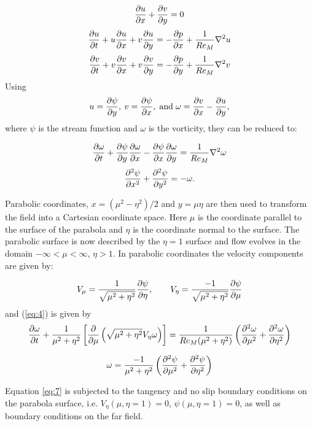 \[
\frac{\partial u}{\partial x} + \frac{\partial v}{\partial y} = 0
\]
\[
\frac{\partial u}{\partial t} + u \frac{\partial u}{\partial x} + v \frac{\partial u}{\partial y} = - \frac{\partial p}{\partial x} + \frac{1}{Re_M} \nabla^2 u
\]
\begin{equation}
\label{eq:1}
\frac{\partial v}{\partial t} + v \frac{\partial v}{\partial x} + v \frac{\partial v}{\partial y} = - \frac{\partial p}{\partial y} + \frac{1}{Re_M} \nabla^2 v
\end{equation}
%
Using
\begin{equation}
\label{eq:2}
u=\frac{\partial \psi}{\partial y},\: v=\frac{\partial \psi}{\partial x},\; \mathrm{and}\; \omega=\frac{\partial v}{\partial x} - \frac{\partial u}{\partial y},
\end{equation}
%
where $\psi$ is the stream function and $\omega$ is the vorticity, they can be reduced to:

\[
\frac{\partial \omega}{\partial t} + \frac{\partial \psi}{\partial y} \frac{\partial \omega}{\partial x} - \frac{\partial \psi}{\partial x} \frac{\partial \omega}{\partial y} = \frac{1}{Re_M} \nabla^2\omega
\]
\begin{equation}
\frac{\partial^2 \psi}{\partial x^2} + \frac{\partial^2 \psi}{\partial y^2} = -\omega.
\label{eq:4}
\end{equation}

Parabolic coordinates, $x=(\mu^2-\eta^2)/2$ and $y=\mu\eta$ are then used to transform the field into a Cartesian coordinate space. Here $\mu$ is the coordinate parallel to the surface of the parabola and $\eta$ is the coordinate normal to the surface. The parabolic surface is now described by the $\eta=1$ surface and flow evolves in the domain $-\infty < \mu < \infty$, $\eta> 1$. In parabolic coordinates the velocity components are given by:

\[
V_\mu=\frac{1}{\sqrt{\mu^2+\eta^2}} \frac{\partial \psi}{\partial \eta}, \quad\quad
V_\eta=\frac{-1}{\sqrt{\mu^2+\eta^2}} \frac{\partial \psi}{\partial \mu}
\]
% 
and (\ref{eq:4}) is given by
\[
\frac{\partial \omega}{\partial t} + \frac{1}{\mu^2 + \eta^2} \left[\frac{\partial}{\partial \mu} \left(\sqrt{\mu^2 + \eta^2} V_\eta \omega \right) \right] = \frac{1}{Re_M(\mu^2 + \eta^2)} \left(\frac{\partial^2 \omega}{\partial \mu^2} + \frac{\partial^2 \omega}{\partial \eta^2} \right)
\]

\begin{equation}
\label{eq:7}
\omega = \frac{-1}{\mu^2 + \eta^2} \left(\frac{\partial^2 \psi}{\partial \mu^2} + \frac{\partial^2 \psi}{\partial \eta^2} \right)
\end{equation}

Equation \ref{eq:7} is subjected to the tangency and no slip boundary conditions on the parabola surface, i.e. $V_\eta(\mu,\eta=1) = 0$, $\psi(\mu,\eta=1) = 0$, as well as boundary conditions on the far field.

